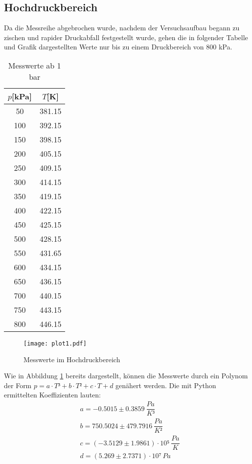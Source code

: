 \subsection{Hochdruckbereich}
  Da die Messreihe abgebrochen wurde, nachdem der Versuchsaufbau begann zu zischen 
  und rapider Druckabfall festgestellt wurde, gehen die in folgender Tabelle und Grafik dargestellten 
  Werte nur bis zu einem Druckbereich von 800 kPa.
  \begin{table}[H]
    \centering
     \caption{Messwerte ab 1 bar}
     \label{tab:data}
     \begin{tabular}{c c}
     \toprule
     $p$[kPa] & $T$[K] \\
      \midrule
       50 &   381.15 \\ 
      100 &   392.15 \\ 
      150 &   398.15 \\ 
      200 &   405.15 \\ 
      250 &   409.15 \\ 
      300 &   414.15 \\ 
      350 &   419.15 \\ 
      400 &   422.15 \\ 
      450 &   425.15 \\ 
      500 &   428.15 \\ 
      550 &   431.65 \\ 
      600 &   434.15 \\ 
      650 &   436.15 \\ 
      700 &   440.15 \\ 
      750 &   443.15 \\ 
      800 &   446.15 \\ 
     \bottomrule
    \end{tabular}
  \end{table}
  \begin{figure}[H]
   \centering
   \texttt{[image: plot1.pdf]}
   \caption{Messwerte im Hochdruckbereich}
   \label{fig:plot1}
  \end{figure}
  \noindent Wie in Abbildung \ref{fig:plot1} bereits dargestellt, können die Messwerte durch ein Polynom
  der Form $p = a \cdot T³ + b \cdot T² + c \cdot T + d$ genähert werden. Die mit Python
  ermittelten Koeffizienten lauten:
  \begin{align*}
    & a = -0.5015 \pm 0.3859 \ \dfrac{Pa}{K³}\\
    & b = 750.5024 \pm 479.7916 \ \dfrac{Pa}{K²}\\
    & c = (-3.5129 \pm 1.9861) \cdot 10⁵ \ \dfrac{Pa}{K}\\
    & d = (5.269 \pm 2.7371) \cdot 10⁷ \ Pa\\
  \end{align*}
